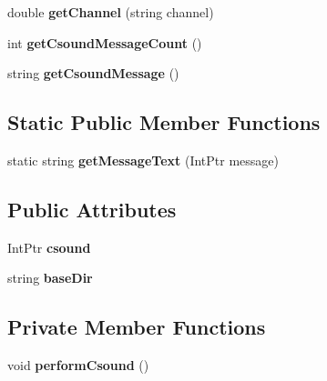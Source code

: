 \begin{DoxyCompactItemize}
\item 
\hypertarget{class_csound_unity_bridge_ad03ed13f979643c174aa950d880db3d4}{}double {\bfseries get\+Channel} (string channel)\label{class_csound_unity_bridge_ad03ed13f979643c174aa950d880db3d4}

\item 
\hypertarget{class_csound_unity_bridge_ab36ce500b56684c503d36b8c6800b1cf}{}int {\bfseries get\+Csound\+Message\+Count} ()\label{class_csound_unity_bridge_ab36ce500b56684c503d36b8c6800b1cf}

\item 
\hypertarget{class_csound_unity_bridge_ab2f9785d9f7bc0abfe45fe5e8d89053b}{}string {\bfseries get\+Csound\+Message} ()\label{class_csound_unity_bridge_ab2f9785d9f7bc0abfe45fe5e8d89053b}

\end{DoxyCompactItemize}
\subsection*{Static Public Member Functions}
\begin{DoxyCompactItemize}
\item 
\hypertarget{class_csound_unity_bridge_a9a3dc9ce5d0733b747baddcd9bdd08ef}{}static string {\bfseries get\+Message\+Text} (Int\+Ptr message)\label{class_csound_unity_bridge_a9a3dc9ce5d0733b747baddcd9bdd08ef}

\end{DoxyCompactItemize}
\subsection*{Public Attributes}
\begin{DoxyCompactItemize}
\item 
\hypertarget{class_csound_unity_bridge_ab8416410166cf1df6ffa0f9523e787f6}{}Int\+Ptr {\bfseries csound}\label{class_csound_unity_bridge_ab8416410166cf1df6ffa0f9523e787f6}

\item 
\hypertarget{class_csound_unity_bridge_a82717626211c2fbb3593942d2a97e4ad}{}string {\bfseries base\+Dir}\label{class_csound_unity_bridge_a82717626211c2fbb3593942d2a97e4ad}

\end{DoxyCompactItemize}
\subsection*{Private Member Functions}
\begin{DoxyCompactItemize}
\item 
\hypertarget{class_csound_unity_bridge_a205a9b3837736076b27bcaf08c17fab5}{}void {\bfseries perform\+Csound} ()\label{class_csound_unity_bridge_a205a9b3837736076b27bcaf08c17fab5}

\end{DoxyCompactItemize}
